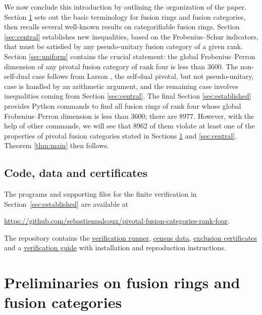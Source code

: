 \documentclass[11pt]{amsart}
\theoremstyle{definition}
\numberwithin{equation}{section}
\begin{document}
We now conclude this introduction by outlining the organization of the paper. 
Section \ref{sec:spherical} sets out the basic terminology for fusion rings and fusion categories, then recalls several well-known results on categorifiable fusion rings. 
Section \ref{sec:central} establishes new inequalities, based on the Frobenius--Schur indicators, that must be satisfied by any pseudo-unitary fusion category of a given rank. 
Section \ref{sec:uniform} contains the crucial statement: the global Frobenius--Perron dimension of any pivotal fusion category of rank four is less than $3600$. 
The non-self-dual case follows from Larson \cite{Larson}, the self-dual pivotal, but not pseudo-unitary, case is handled by an arithmetic argument, and the remaining case involves inequalities coming from Section \ref{sec:central}.
The final Section \ref{sec:established} provides Python commands to find all fusion rings of rank four whose global Frobenius--Perron dimension is less than $3600$; there are $8977$. 
However, with the help of other commands, we will see that $8962$ of them violate at least one of the properties of pivotal fusion categories stated in Sections \ref{sec:spherical} and \ref{sec:central}. Theorem \ref{thm:main} then follows. 

\subsection*{Code, data and certificates}
\hypertarget{code-data-certificates}{}
The programs and supporting files for the finite verification in
Section~\ref{sec:established} are available at
\begin{center}
\url{https://github.com/sebastienpalcoux/pivotal-fusion-categories-rank-four}.
\end{center}
The repository contains the
\href{https://github.com/sebastienpalcoux/pivotal-fusion-categories-rank-four/blob/main/supplementary/check.py}{verification runner},
\href{https://github.com/sebastienpalcoux/pivotal-fusion-categories-rank-four/tree/main/supplementary/census/data}{census data},
\href{https://github.com/sebastienpalcoux/pivotal-fusion-categories-rank-four/blob/main/supplementary/classification/results/certificates.jsonl}{exclusion certificates}
and a \href{https://github.com/sebastienpalcoux/pivotal-fusion-categories-rank-four/blob/main/supplementary/README.md}{verification guide}
with installation and reproduction instructions.

\section{Preliminaries on fusion rings and fusion categories}\label{sec:spherical}
\end{document}
